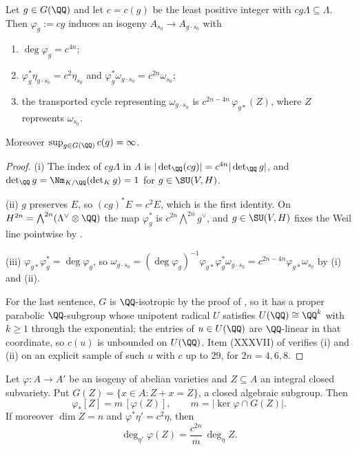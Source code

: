 \begin{lemma}\label{lem:transport}
Let $g\in G(\QQ)$ and let $c=c(g)$ be the least positive integer with
$cg\Lambda\subseteq\Lambda$. Then $\varphi_{g}:=cg$ induces an isogeny
$A_{s_{0}}\to A_{g\cdot s_{0}}$ with
\begin{enumerate}[label=\textup{(\roman*)},nosep,leftmargin=2.6em]
\item $\deg\varphi_{g}=c^{4n}$;
\item $\varphi_{g}^{*}\eta_{g\cdot s_{0}}=c^{2}\eta_{s_{0}}$ and
  $\varphi_{g}^{*}\omega_{g\cdot s_{0}}=c^{2n}\omega_{s_{0}}$;
\item the transported cycle representing $\omega_{g\cdot s_{0}}$ is
  $c^{2n-4n}\,\varphi_{g*}(Z)$, where $Z$ represents $\omega_{s_{0}}$.
\end{enumerate}
Moreover $\sup_{g\in G(\QQ)}c(g)=\infty$.
\end{lemma}

\begin{proof}
(i) The index of $cg\Lambda$ in $\Lambda$ is $|\det_{\QQ}(cg)|
=c^{4n}|\det_{\QQ}g|$, and $\det_{\QQ}g=\Nm_{K/\QQ}(\det_{K}g)=1$ for
$g\in\SU(V,H)$.

(ii) $g$ preserves $E$, so $(cg)^{*}E=c^{2}E$, which is the first identity.
On $H^{2n}=\bigwedge^{2n}(\Lambda^{\vee}\otimes\QQ)$ the map
$\varphi_{g}^{*}$ is $c^{2n}\bigwedge^{2n}g^{\vee}$, and $g\in\SU(V,H)$ fixes
the Weil line pointwise by .

(iii) $\varphi_{g*}\varphi_{g}^{*}=\deg\varphi_{g}$, so
$\omega_{g\cdot s_{0}}=(\deg\varphi_{g})^{-1}\varphi_{g*}
\varphi_{g}^{*}\omega_{g\cdot s_{0}}
=c^{2n-4n}\varphi_{g*}\omega_{s_{0}}$ by (i) and (ii).

For the last sentence, $G$ is $\QQ$-isotropic by the proof of
, so it has a proper parabolic $\QQ$-subgroup whose
unipotent radical $U$ satisfies $U(\QQ)\cong\QQ^{k}$ with $k\ge1$ through the
exponential; the entries of $u\in U(\QQ)$ are $\QQ$-linear in that coordinate,
so $c(u)$ is unbounded on $U(\QQ)$. Item (XXXVII) of 
verifies (i) and (ii) on an explicit sample of such $u$ with $c$ up to $29$,
for $2n=4,6,8$.
\end{proof}

\begin{lemma}
\label{lem:multiplicity}
Let $\varphi\colon A\to A'$ be an isogeny of abelian varieties and $Z\subseteq A$
an integral closed subvariety. Put
$G(Z)=\{x\in A:Z+x=Z\}$, a closed algebraic subgroup. Then
\[
  \varphi_{*}[Z]=m\,[\varphi(Z)],\qquad
  m=\bigl|\ker\varphi\cap G(Z)\bigr| .
\]
If moreover $\dim Z=n$ and $\varphi^{*}\eta'=c^{2}\eta$, then
\[
  \deg_{\eta'}\varphi(Z)=\frac{c^{2n}}{m}\,\deg_{\eta}Z .
\]
\end{lemma}


